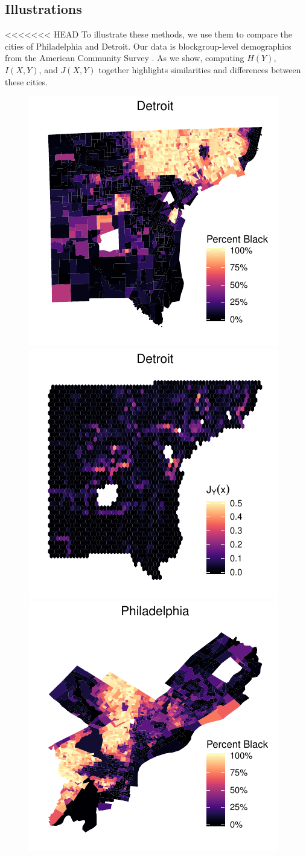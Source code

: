 \documentclass[english]{scrartcl}
\begin{document}
	\subsection{Illustrations}
<<<<<<< HEAD
			To illustrate these methods, we use them to compare the cities of Philadelphia and Detroit. Our data is blockgroup-level demographics from the American Community Survey \cite{CensusRace}. As we show, computing $H(Y)$, $I(X,Y)$, and $J(X,Y)$ together highlights similarities and differences between these cities. 
			\begin{figure}
				\includegraphics[width = .5\textwidth]{figs/Detroit_percent_black.pdf}
				\includegraphics[width = .5\textwidth]{figs/Detroit_grid.pdf} \\
				\includegraphics[width = .5\textwidth]{figs/Philadelphia_percent_black.pdf}

\end{figure}
\end{document}
